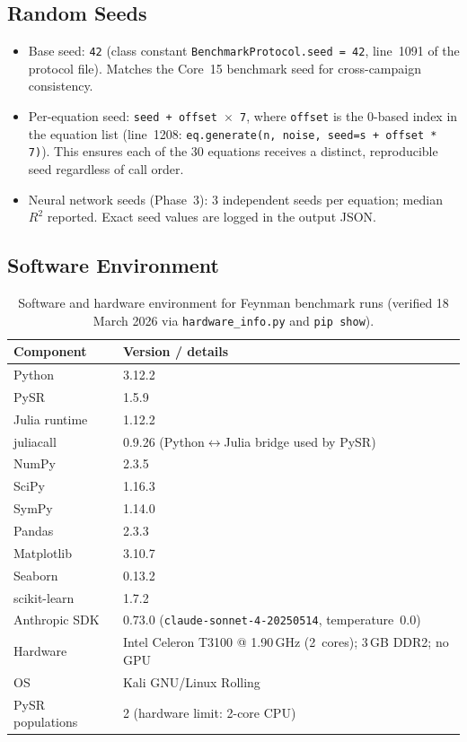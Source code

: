 \documentclass[twoside,11pt]{article}
\begin{document}
\subsection*{Random Seeds}

\begin{itemize}
  \item Base seed: \texttt{42} (class constant
    \texttt{BenchmarkProtocol.seed = 42}, line~1091 of the protocol file).
    Matches the Core~15 benchmark seed for cross-campaign consistency.
  \item Per-equation seed: \texttt{seed + offset $\times$ 7}, where
    \texttt{offset} is the 0-based index in the equation list
    (line~1208: \texttt{eq.generate(n, noise, seed=s + offset * 7)}).
    This ensures each of the 30 equations receives a distinct, reproducible
    seed regardless of call order.
  \item Neural network seeds (Phase~3): 3 independent seeds per equation;
    median $R^2$ reported. Exact seed values are logged in the output JSON.
\end{itemize}

\subsection*{Software Environment}

\begin{table}[H]
\centering
\caption{Software and hardware environment for Feynman benchmark runs
         (verified 18 March 2026 via \texttt{hardware\_info.py} and
         \texttt{pip show}).}
\label{tab:software_env}
\small
\begin{tabular}{ll}
\toprule
\textbf{Component} & \textbf{Version / details} \\
\midrule
Python           & 3.12.2 \\
PySR             & 1.5.9 \\
Julia runtime    & 1.12.2 \\
juliacall        & 0.9.26 (Python$\leftrightarrow$Julia bridge used by PySR) \\
NumPy            & 2.3.5 \\
SciPy            & 1.16.3 \\
SymPy            & 1.14.0 \\
Pandas           & 2.3.3 \\
Matplotlib       & 3.10.7 \\
Seaborn          & 0.13.2 \\
scikit-learn     & 1.7.2 \\
Anthropic SDK    & 0.73.0 (\texttt{claude-sonnet-4-20250514},
                   temperature~0.0) \\
\midrule
Hardware         & Intel Celeron T3100 @ 1.90\,GHz (2~cores);
                   3\,GB DDR2; no GPU \\
OS               & Kali GNU/Linux Rolling \\
PySR populations & 2 (hardware limit: 2-core CPU) \\
\bottomrule
\end{tabular}
\end{table}
\end{document}
